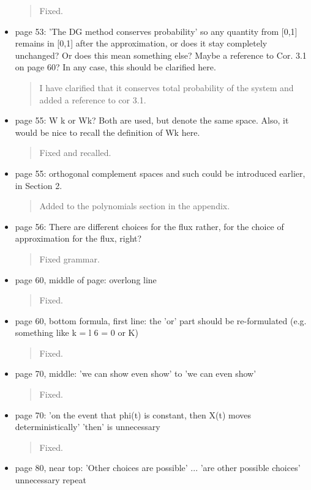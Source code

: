\documentclass[a4paper]{article}
\begin{document}
\begin{itemize}
\begin{quote}
    Fixed. 
\end{quote}
\item {page 53: 'The DG method conserves probability' so any quantity from [0,1] remains
in [0,1] after the approximation, or does it stay completely unchanged? Or does this
mean something else? Maybe a reference to Cor. 3.1 on page 60? In any case, this
should be clarified here.}
\begin{quote}
    I have clarified that it conserves total probability of the system and added a reference to cor 3.1.
\end{quote}
\item {page 55: W k or Wk? Both are used, but denote the same space. Also, it would be
nice to recall the definition of Wk here.}
\begin{quote}
    Fixed and recalled.
\end{quote}
\item page 55: orthogonal complement spaces and such could be introduced earlier, in
Section 2.
\begin{quote}
    Added to the polynomials section in the appendix. 
\end{quote}
\item {page 56: There are different choices for the flux rather, for the choice of approximation for the flux, right?}
\begin{quote}
    Fixed grammar.
\end{quote}
\item {page 60, middle of page: overlong line}
\begin{quote}
    Fixed. 
\end{quote}
\item {page 60, bottom formula, first line: the 'or' part should be re-formulated (e.g.
something like k = l 6 = 0 or K)}
\begin{quote}
    Fixed. 
\end{quote}
\item {page 70, middle: 'we can show even show' to 'we can even show'}
\begin{quote}
    Fixed. 
\end{quote}
\item {page 70: 'on the event that phi(t) is constant, then X(t) moves deterministically' 'then' is unnecessary}
\begin{quote}
    Fixed. 
\end{quote}
\item {page 80, near top: 'Other choices are possible' ... 'are other possible choices' unnecessary repeat}

\end{itemize}
\end{document}
